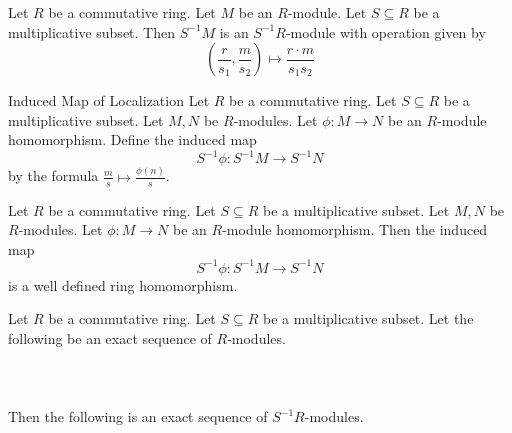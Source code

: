 \documentclass[a4paper]{article}
\begin{document}
\begin{lmm}{}{} Let $R$ be a commutative ring. Let $M$ be an $R$-module. Let $S\subseteq R$ be a multiplicative subset. Then $S^{-1}M$ is an $S^{-1}R$-module with operation given by $$\left(\frac{r}{s_1},\frac{m}{s_2}\right)\mapsto\frac{r\cdot m}{s_1s_2}$$
\end{lmm}

\begin{defn}{Induced Map of Localization}{} Let $R$ be a commutative ring. Let $S\subseteq R$ be a multiplicative subset. Let $M,N$ be $R$-modules. Let $\phi:M\to N$ be an $R$-module homomorphism. Define the induced map $$S^{-1}\phi:S^{-1}M\to S^{-1}N$$ by the formula $\frac{m}{s}\mapsto\frac{\phi(n)}{s}$. 
\end{defn}

\begin{lmm}{}{} Let $R$ be a commutative ring. Let $S\subseteq R$ be a multiplicative subset. Let $M,N$ be $R$-modules. Let $\phi:M\to N$ be an $R$-module homomorphism. Then the induced map $$S^{-1}\phi:S^{-1}M\to S^{-1}N$$ is a well defined ring homomorphism. 
\end{lmm}

\begin{prp}{}{} Let $R$ be a commutative ring. Let $S\subseteq R$ be a multiplicative subset. Let the following be an exact sequence of $R$-modules. \\~\\
\\~\\
Then the following is an exact sequence of $S^{-1}R$-modules. \\~\\
\\~\\
\end{prp}
\end{document}
